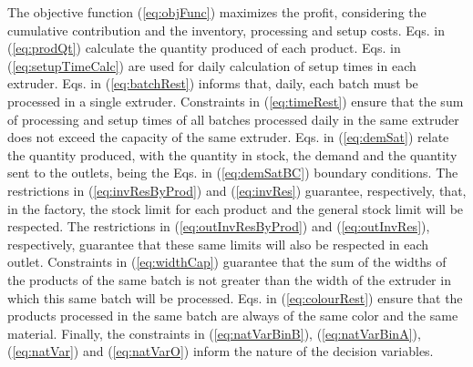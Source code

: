 The objective function (\ref{eq:objFunc}) maximizes the profit, considering the cumulative contribution and the inventory, processing and setup costs. Eqs. in (\ref{eq:prodQt}) calculate the quantity produced of each product. Eqs. in (\ref{eq:setupTimeCalc}) are used for daily calculation of setup times in each extruder. Eqs. in (\ref{eq:batchRest}) informs that, daily, each batch must be processed in a single extruder. Constraints in (\ref{eq:timeRest}) ensure that the sum of processing and setup times of all batches processed daily in the same extruder does not exceed the capacity of the same extruder. Eqs. in (\ref{eq:demSat}) relate the quantity produced, with the quantity in stock, the demand and the quantity sent to the outlets, being the Eqs. in (\ref{eq:demSatBC}) boundary conditions. The restrictions in (\ref{eq:invResByProd}) and (\ref{eq:invRes}) guarantee, respectively, that, in the factory, the stock limit for each product and the general stock limit will be respected.  The restrictions in (\ref{eq:outInvResByProd}) and (\ref{eq:outInvRes}), respectively, guarantee that these same limits will also be respected in each outlet. Constraints in (\ref{eq:widthCap}) guarantee that the sum of the widths of the products of the same batch is not greater than the width of the extruder in which this same batch will be processed. Eqs. in (\ref{eq:colourRest}) ensure that the products processed in the same batch are always of the same color and the same material. Finally, the constraints in (\ref{eq:natVarBinB}), (\ref{eq:natVarBinA}), (\ref{eq:natVar}) and (\ref{eq:natVarO}) inform the nature of the decision variables.

